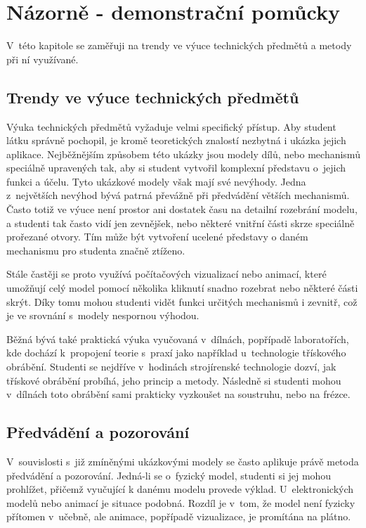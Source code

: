 \chapter{Názorně - demonstrační pomůcky}
V~této kapitole se zaměřuji na trendy ve výuce technických předmětů a metody při ní využívané.

\section{Trendy ve výuce technických předmětů}
Výuka technických předmětů vyžaduje velmi specifický přístup.
Aby student látku správně pochopil, je kromě teoretických znalostí nezbytná i ukázka jejich aplikace.
Nejběžnějším způsobem této ukázky jsou modely dílů, nebo mechanismů speciálně upravených tak, aby si student vytvořil komplexní představu o~jejich funkci a účelu.
Tyto ukázkové modely však mají své nevýhody. 
Jedna z~největších nevýhod bývá patrná převážně při předvádění větších mechanismů.
Často totiž ve výuce není prostor ani dostatek času na detailní rozebrání modelu, a studenti tak často vidí jen zevnějšek, nebo některé vnitřní části skrze speciálně prořezané otvory.
Tím může být vytvoření ucelené představy o daném mechanismu pro studenta značně ztíženo.

Stále častěji se proto využívá počítačových vizualizací nebo animací, které umožňují celý model pomocí několika kliknutí snadno rozebrat nebo některé části skrýt. 
Díky tomu mohou studenti vidět funkci určitých mechanismů i zevnitř, což je ve srovnání s~modely nespornou výhodou.

Běžná bývá také praktická výuka vyučovaná v~dílnách, popřípadě laboratořích, kde dochází k~propojení teorie s~praxí jako například u~technologie třískového obrábění.
Studenti se nejdříve v~hodinách strojírenské technologie dozví, jak třískové obrábění probíhá, jeho princip a metody.
Následně si studenti mohou v~dílnách toto obrábění sami prakticky vyzkoušet na soustruhu, nebo na frézce.

\section{Předvádění a pozorování}
V~souvislosti s~již zmíněnými ukázkovými modely se často aplikuje právě metoda předvádění a pozorování.
Jedná-li se o~fyzický model, studenti si jej mohou prohlížet, přičemž vyučující k danému modelu provede výklad.
U~elektronických modelů nebo animací je situace podobná.
Rozdíl je v~tom, že model není fyzicky přítomen v~učebně, ale animace, popřípadě vizualizace, je promítána na plátno.

